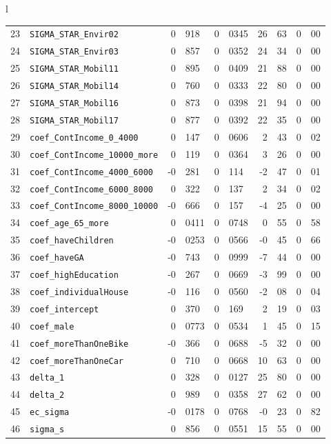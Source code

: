 \documentclass[12pt,a4paper]{article}
\begin{document}
\begin{table}[htb]
\begin{tabular}{l}
\begin{tabular}{rlr@{.}lr@{.}lr@{.}lr@{.}l}
23 & \lstinline$SIGMA_STAR_Envir02$ & 0&918 & 0&0345 & 26&63 & 0&00\\
24 & \lstinline$SIGMA_STAR_Envir03$ & 0&857 & 0&0352 & 24&34 & 0&00\\
25 & \lstinline$SIGMA_STAR_Mobil11$ & 0&895 & 0&0409 & 21&88 & 0&00\\
26 & \lstinline$SIGMA_STAR_Mobil14$ & 0&760 & 0&0333 & 22&80 & 0&00\\
27 & \lstinline$SIGMA_STAR_Mobil16$ & 0&873 & 0&0398 & 21&94 & 0&00\\
28 & \lstinline$SIGMA_STAR_Mobil17$ & 0&877 & 0&0392 & 22&35 & 0&00\\
29 & \lstinline$coef_ContIncome_0_4000$ & 0&147 & 0&0606 & 2&43 & 0&02\\
30 & \lstinline$coef_ContIncome_10000_more$ & 0&119 & 0&0364 & 3&26 & 0&00\\
31 & \lstinline$coef_ContIncome_4000_6000$ & -0&281 & 0&114 & -2&47 & 0&01\\
32 & \lstinline$coef_ContIncome_6000_8000$ & 0&322 & 0&137 & 2&34 & 0&02\\
33 & \lstinline$coef_ContIncome_8000_10000$ & -0&666 & 0&157 & -4&25 & 0&00\\
34 & \lstinline$coef_age_65_more$ & 0&0411 & 0&0748 & 0&55 & 0&58\\
35 & \lstinline$coef_haveChildren$ & -0&0253 & 0&0566 & -0&45 & 0&66\\
36 & \lstinline$coef_haveGA$ & -0&743 & 0&0999 & -7&44 & 0&00\\
37 & \lstinline$coef_highEducation$ & -0&267 & 0&0669 & -3&99 & 0&00\\
38 & \lstinline$coef_individualHouse$ & -0&116 & 0&0560 & -2&08 & 0&04\\
39 & \lstinline$coef_intercept$ & 0&370 & 0&169 & 2&19 & 0&03\\
40 & \lstinline$coef_male$ & 0&0773 & 0&0534 & 1&45 & 0&15\\
41 & \lstinline$coef_moreThanOneBike$ & -0&366 & 0&0688 & -5&32 & 0&00\\
42 & \lstinline$coef_moreThanOneCar$ & 0&710 & 0&0668 & 10&63 & 0&00\\
43 & \lstinline$delta_1$ & 0&328 & 0&0127 & 25&80 & 0&00\\
44 & \lstinline$delta_2$ & 0&989 & 0&0358 & 27&62 & 0&00\\
45 & \lstinline$ec_sigma$ & -0&0178 & 0&0768 & -0&23 & 0&82\\
46 & \lstinline$sigma_s$ & 0&856 & 0&0551 & 15&55 & 0&00\\

\end{tabular}
\end{tabular}
\end{table}
\end{document}
